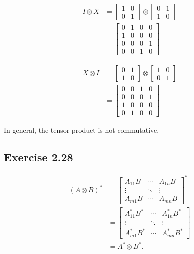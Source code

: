 \documentclass[a4paper,12pt]{article}
\begin{document}
\begin{align*}
	I \otimes X &= \begin{bmatrix}
		1 & 0 \\
		0 & 1
	\end{bmatrix}
	\otimes
	\begin{bmatrix}
		0 & 1 \\
		1 & 0
	\end{bmatrix}\\
	&=
	\begin{bmatrix}
	0 & 1 & 0 & 0 \\
	1 & 0 & 0 & 0 \\
	0 & 0 & 0 & 1 \\
	0 & 0 & 1 & 0
	\end{bmatrix}
\end{align*}

\begin{align*}
	X \otimes I &= \begin{bmatrix}
		0 & 1 \\
		1 & 0
	\end{bmatrix}
	\otimes
	\begin{bmatrix}
		1 & 0 \\
		0 & 1
	\end{bmatrix}\\
	&= \begin{bmatrix}
	0 & 0 & 1 & 0 \\
	0 & 0 & 0 & 1 \\
	1 & 0 & 0 & 0 \\
	0 & 1 & 0 & 0
	\end{bmatrix}
\end{align*}

In general, the tensor product is not commutative.



\subsection*{Exercise 2.28}
\begin{align*}
	(A \otimes B)^*
	&=
	\begin{bmatrix}
		A_{11} B & \cdots & A_{1n} B \\
		\vdots & \ddots  & \vdots \\
		A_{m1}B & \cdots & A_{mn} B
	\end{bmatrix}^* \\
	&=
	\begin{bmatrix}
		A_{11}^* B^* & \cdots & A_{1n}^* B^* \\
		\vdots & \ddots  & \vdots \\
		A_{m1}^* B^* & \cdots & A_{mn}^* B^*
	\end{bmatrix} \\
	&= A^* \otimes B^*.
\end{align*}
\end{document}

